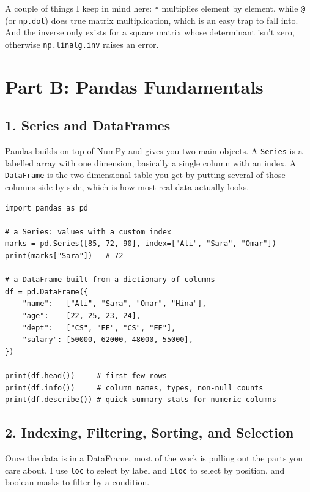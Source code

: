 \documentclass[11pt,a4paper]{article}
\begin{document}
A couple of things I keep in mind here: \texttt{*} multiplies element by element, while \texttt{@} (or \texttt{np.dot}) does true matrix multiplication, which is an easy trap to fall into. And the inverse only exists for a square matrix whose determinant isn't zero, otherwise \texttt{np.linalg.inv} raises an error.

\section*{Part B: Pandas Fundamentals}

\subsection*{1. Series and DataFrames}
Pandas builds on top of NumPy and gives you two main objects. A \texttt{Series} is a labelled array with one dimension, basically a single column with an index. A \texttt{DataFrame} is the two dimensional table you get by putting several of those columns side by side, which is how most real data actually looks.

\begin{lstlisting}[style=py, caption={Creating a Series and a DataFrame.}]
import pandas as pd

# a Series: values with a custom index
marks = pd.Series([85, 72, 90], index=["Ali", "Sara", "Omar"])
print(marks["Sara"])   # 72

# a DataFrame built from a dictionary of columns
df = pd.DataFrame({
    "name":   ["Ali", "Sara", "Omar", "Hina"],
    "age":    [22, 25, 23, 24],
    "dept":   ["CS", "EE", "CS", "EE"],
    "salary": [50000, 62000, 48000, 55000],
})

print(df.head())     # first few rows
print(df.info())     # column names, types, non-null counts
print(df.describe()) # quick summary stats for numeric columns
\end{lstlisting}

\subsection*{2. Indexing, Filtering, Sorting, and Selection}
Once the data is in a DataFrame, most of the work is pulling out the parts you care about. I use \texttt{loc} to select by label and \texttt{iloc} to select by position, and boolean masks to filter by a condition.
\end{document}
